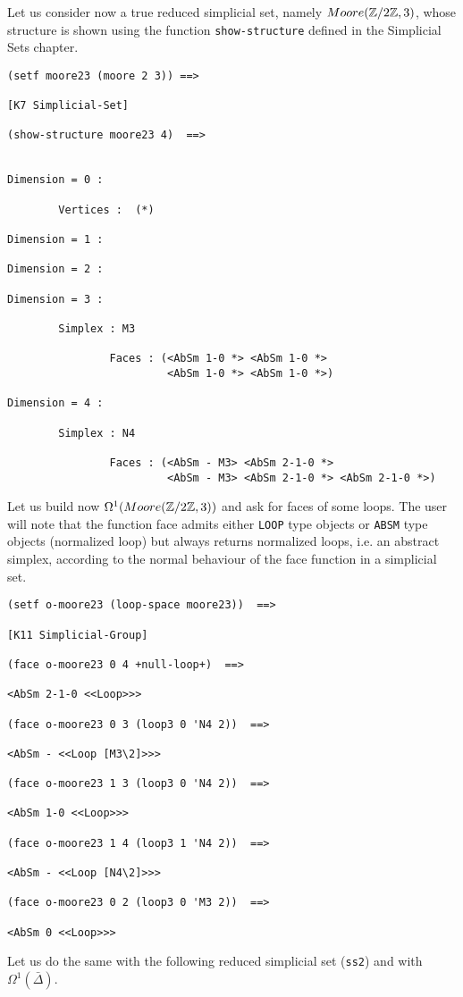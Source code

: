 Let us consider now a true reduced simplicial set, namely $Moore({\mathbb{Z}}/{2{\mathbb{Z}}}, 3)$,
whose structure is shown using the function {\tt show-structure} defined in the Simplicial Sets chapter.
{\footnotesize\begin{verbatim}
(setf moore23 (moore 2 3)) ==>

[K7 Simplicial-Set]

(show-structure moore23 4)  ==>


Dimension = 0 :

        Vertices :  (*)

Dimension = 1 :

Dimension = 2 :

Dimension = 3 :

        Simplex : M3

                Faces : (<AbSm 1-0 *> <AbSm 1-0 *>
                         <AbSm 1-0 *> <AbSm 1-0 *>)

Dimension = 4 :

        Simplex : N4

                Faces : (<AbSm - M3> <AbSm 2-1-0 *>
                         <AbSm - M3> <AbSm 2-1-0 *> <AbSm 2-1-0 *>)
\end{verbatim}}
Let us build now $\Omega^1(Moore({\mathbb{Z}}/{2{\mathbb{Z}}}, 3))$ and ask for faces of some loops.
The user will note that the function face admits either {\tt LOOP} type objects or
{\tt ABSM} type objects (normalized loop) but always returns normalized loops, i.e.
an abstract simplex, according to the normal behaviour of the face function in a
simplicial set.
{\footnotesize\begin{verbatim}
(setf o-moore23 (loop-space moore23))  ==>

[K11 Simplicial-Group]

(face o-moore23 0 4 +null-loop+)  ==>

<AbSm 2-1-0 <<Loop>>>

(face o-moore23 0 3 (loop3 0 'N4 2))  ==>

<AbSm - <<Loop [M3\2]>>>

(face o-moore23 1 3 (loop3 0 'N4 2))  ==>

<AbSm 1-0 <<Loop>>>

(face o-moore23 1 4 (loop3 1 'N4 2))  ==>

<AbSm - <<Loop [N4\2]>>>

(face o-moore23 0 2 (loop3 0 'M3 2))  ==>

<AbSm 0 <<Loop>>>
\end{verbatim}}
\newpage
Let us do the same with the following reduced simplicial set ({\tt ss2}) and with $\Omega^1(\bar{\Delta})$.
